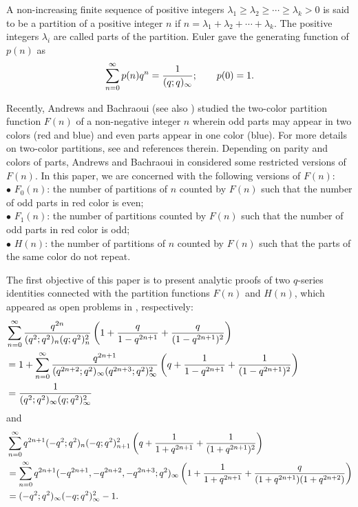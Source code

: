 \documentclass[12pt]{article}
\numberwithin{equation}{section}
\theoremstyle{definition}
\theoremstyle{remark}
\numberwithin{equation}{section}
\begin{document}
A non-increasing finite sequence of positive integers
$
\lambda_1\geq \lambda_2\geq\cdots\geq \lambda_k>0
$
is said to be a partition of a positive integer $n$ if
$
n=\lambda_1+\lambda_2+\cdots+\lambda_k.
$ The positive integers $\lambda_i$ are called parts of the partition.
Euler \cite{euler1748introductio} gave the generating function of $p(n)$ as
$$
  \sum_{n=0}^{\infty} p(n) q^n = \dfrac{1}{(q; q)_\infty}; \qquad p(0)=1.\notag 
$$

Recently, Andrews and Bachraoui  \cite{2clr} (see also \cite{arx})  studied the two-color partition function \( F(n) \) of a non-negative integer \( n \) wherein odd parts may appear in two colors (red and blue) and even parts appear in one color (blue).  For more details on two-color partitions, see \cite{and1987,and2021,andbach,andkumar} and references therein. 
Depending on parity and colors of parts, Andrews and Bachraoui in \cite{2clr}  considered some restricted versions of \( F(n) \). In this paper, we are concerned with the following versions of $F(n)$:\\
$\bullet$ \( F_0(n) \): the number of partitions of \( n \) counted by \( F(n) \) such that the number of odd parts in red color is even; \\
$\bullet$ \( F_1(n)\): the number of partitions counted by \( F(n) \) such that the number of odd parts in red color is odd; \\
$\bullet$ \( H(n) \): the number of partitions of \( n \) counted by \( F(n) \) such that the parts of the same color do not repeat. 

The first objective of this paper is to present  analytic proofs of two \(q\)-series identities connected with the partition functions  \( F(n) \) and \( H(n) \), which appeared as open problems in  \cite[pp. 10--11, (5.3) and (5.6)] {2clr}, respectively:
\begin{align}
	&\hspace{-2cm}\sum_{n=0}^{\infty}
	\dfrac{q^{2n}}{(q^2;q^2)_n(q;q^2)_n^2}
	\left(
	1+\dfrac{q}{1-q^{2n+1}}
	+\dfrac{q}{(1-q^{2n+1})^2}
	\right)\notag\\
	&\hspace{-2cm}=1+\sum_{n=0}^{\infty}
	\dfrac{q^{2n+1}}{(q^{2n+2};q^2)_\infty(q^{2n+3};q^2)_\infty^2}
	\left(
	q+\dfrac{1}{1-q^{2n+1}}
	+\dfrac{1}{(1-q^{2n+1})^2}
	\right)\notag\\
	\label{OP1}&\hspace{-2cm}=
	\dfrac{1}{(q^2;q^2)_\infty(q;q^2)_\infty^2}
\end{align}    and 
\begin{align}
	&\sum_{n=0}^{\infty}
	q^{2n+1}(-q^2;q^2)_n(-q;q^2)_{n+1}^2
	\left(
	q+\dfrac{1}{1+q^{2n+1}}
	+\dfrac{1}{(1+q^{2n+1})^2}
	\right)\notag\\
	&=\sum_{n=0}^{\infty}
	q^{2n+1}(-q^{2n+1},-q^{2n+2},-q^{2n+3};q^2)_\infty
	\left(
	1+\dfrac{1}{1+q^{2n+1}}
	+\dfrac{q}{(1+q^{2n+1})(1+q^{2n+2})}
	\right)\notag\\
	\label{2op5.6}&=
	(-q^2;q^2)_\infty(-q;q^2)_\infty^2-1.
\end{align}
\end{document}
